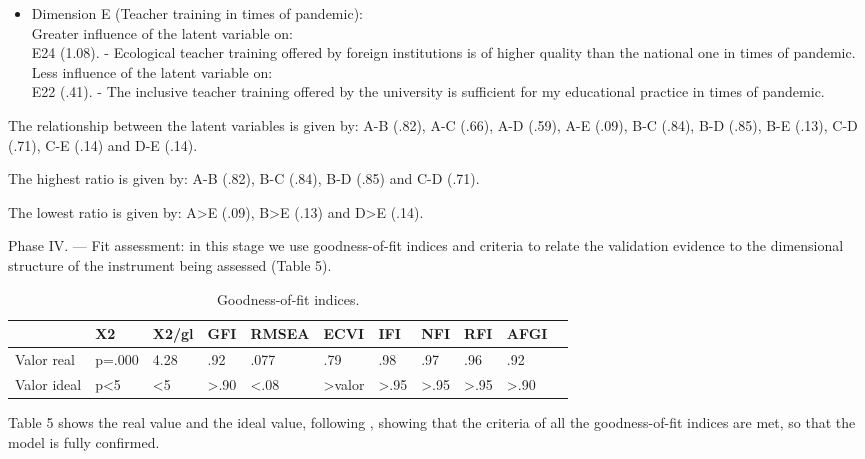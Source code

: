 \documentclass[english]{textolivre}
\begin{document}
\begin{itemize}
    \item Dimension E (Teacher training in times of pandemic):
    \\ Greater influence of the latent variable on:
    \\ E24 (1.08). - Ecological teacher training offered by foreign institutions is of higher quality than the national one in times of pandemic.
    \\ Less influence of the latent variable on:
    \\ E22 (.41). - The inclusive teacher training offered by the university is sufficient for my educational practice in times of pandemic.
\end{itemize}

The relationship between the latent variables is given by: A-B (.82), A-C (.66), A-D (.59), A-E (.09), B-C (.84), B-D (.85), B-E (.13), C-D (.71), C-E (.14) and D-E (.14).

The highest ratio is given by: A-B (.82), B-C (.84), B-D (.85) and C-D (.71).

The lowest ratio is given by: A>E (.09), B>E (.13) and D>E (.14).

Phase IV. — Fit assessment: in this stage we use goodness-of-fit indices and criteria to relate the validation evidence to the dimensional structure of the instrument being assessed (Table 5).

\begin{table}[htpb]
\caption{Goodness-of-fit indices.}
\label{tab5}
\centering
\begin{tabular}{p{}llllllllll}
\toprule 
& X2 & X2/gl & GFI & RMSEA & ECVI & IFI	& NFI & RFI & AFGI
\\
\midrule
Valor real & p=.000	& 4.28 & .92 & .077 & .79 & .98 & .97 & .96 & .92
\\
Valor ideal & p<5 & <5 & >.90 & <.08 & >valor	& >.95 & >.95 & >.95 & >.90
\\
\bottomrule
\end{tabular}
\centering
\end{table}

Table 5 shows the real value and the ideal value, following \textcite{levy2006}, %
showing that the criteria of all the goodness-of-fit indices are met, so that the model is fully confirmed.
\end{document}

